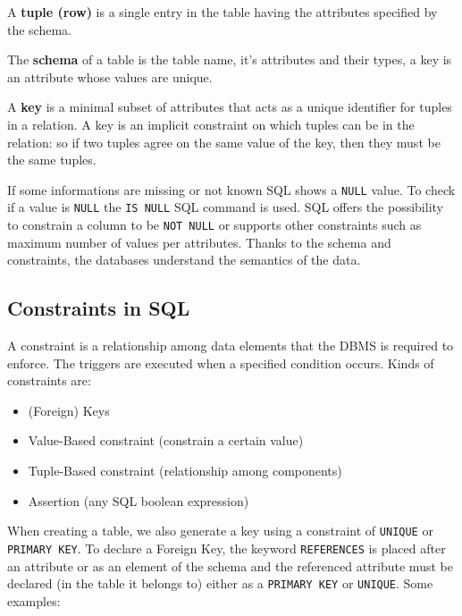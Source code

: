 \documentclass[a4page, 11pt]{article}
\theoremstyle{definition}
\begin{document}
A \textbf{tuple (row)} is a single entry in the table having the attributes specified by the schema.

The \textbf{schema} of a table is the table name, it's attributes and their types, a key is an attribute whose values are unique. 

A \textbf{key} is a minimal subset of attributes that acts as a unique identifier for tuples in a relation.  A key is an implicit constraint on which tuples can be in the relation: so if two tuples agree on the same value of the key, then they must be the same tuples. 

If some informations are missing or not known SQL shows a \texttt{NULL} value.
To check if a value is \texttt{NULL} the \texttt{IS NULL} SQL command is used. 
SQL offers the possibility to constrain a column to be \texttt{NOT NULL} or supports other constraints such as maximum number of values per attributes.
Thanks to the schema and constraints, the databases understand the semantics of the data.

\subsection{Constraints in SQL}
A constraint is a relationship among data elements that the DBMS is required to enforce. The triggers are executed when a specified condition occurs. %
Kinds of constraints are:
\begin{itemize}[noitemsep]
	\item (Foreign) Keys
	\item Value-Based constraint (constrain a certain value)
	\item Tuple-Based constraint (relationship among components)
	\item Assertion (any SQL boolean expression)
\end{itemize}
When creating a table, we also generate a key using a constraint of \texttt{UNIQUE} or \texttt{PRIMARY KEY}. 
To declare a Foreign Key, the keyword \texttt{REFERENCES} is placed after an attribute or as an element of the schema and the referenced attribute must be declared (in the table it belongs to) either as a \texttt{PRIMARY KEY} or \texttt{UNIQUE}. 
Some examples:
\end{document}
